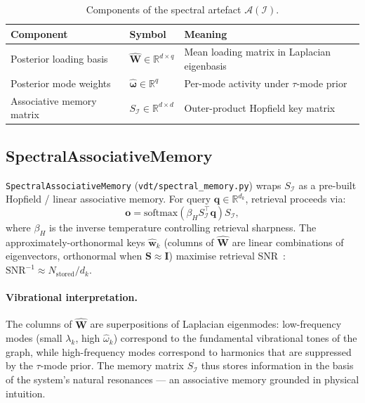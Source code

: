 \documentclass[11pt,a4paper]{article}
\newcommand{\R}{\mathbb{R}}
\newcommand{\I}{\mathcal{I}}
\newcommand{\A}{\mathcal{A}}
\newcommand{\bS}{\bm{S}}
\newcommand{\bW}{\bm{W}}
\newcommand{\bomega}{\bm{\omega}}
\begin{document}
\begin{table}[h]
\centering
\caption{Components of the spectral artefact $\A(\I)$.}
\label{tab:artefact}
\begin{tabular}{@{}lll@{}}
\toprule
Component & Symbol & Meaning \\
\midrule
Posterior loading basis & $\hat{\bW}\in\R^{d\times q}$ & Mean loading matrix in Laplacian eigenbasis \\
Posterior mode weights & $\hat{\bomega}\in\R^q$ & Per-mode activity under $\tau$-mode prior \\
Associative memory matrix & $S_{\I}\in\R^{d\times d}$ & Outer-product Hopfield key matrix \\
\bottomrule
\end{tabular}
\end{table}

\subsection{SpectralAssociativeMemory}
\label{sec:assoc_mem}

\texttt{SpectralAssociativeMemory} (\texttt{vdt/spectral\_memory.py}) wraps
$S_{\I}$ as a pre-built Hopfield / linear associative memory.  For query
$\bm{q}\in\R^{d_k}$, retrieval proceeds via:
\begin{equation}
  \bm{o} = \mathrm{softmax}\!\left(\beta_H S_{\I}^\top \bm{q}\right) S_{\I},
  \label{eq:hopfield}
\end{equation}
where $\beta_H$ is the inverse temperature controlling retrieval sharpness.
The approximately-orthonormal keys $\hat{\bm{w}}_k$ (columns of $\hat{\bW}$
are linear combinations of eigenvectors, orthonormal when $\bS\approx\bm{I}$)
maximise retrieval SNR~\citep{ramsauer2020hopfield}:
$\mathrm{SNR}^{-1}\approx N_{\mathrm{stored}}/d_k$.

\paragraph{Vibrational interpretation.}
The columns of $\hat{\bW}$ are superpositions of Laplacian eigenmodes:
low-frequency modes (small $\lambda_k$, high $\hat{\omega}_k$) correspond to
the fundamental vibrational tones of the graph, while high-frequency modes
correspond to harmonics that are suppressed by the $\tau$-mode prior.  The
memory matrix $S_{\I}$ thus stores information in the basis of the system's
natural resonances --- an associative memory grounded in physical intuition.
\end{document}
